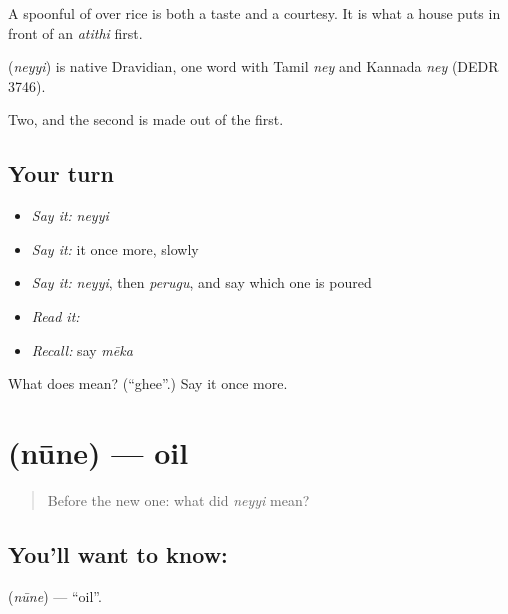 A spoonful of  over rice is both a taste and a courtesy. It is what a house puts in front of an \emph{atithi} first.

\begin{cousinweb}
\textbf{} (\emph{neyyi}) is native Dravidian, one word with Tamil \emph{ney} and Kannada \emph{ney} (DEDR 3746).
\end{cousinweb}

\begin{grammarlens}[title={What you've built}]
Two, and the second is made out of the first.
\end{grammarlens}

\subsection*{Your turn}
\begin{itemize}
\raggedright
  \item \emph{Say it:} \emph{neyyi}
  \item \emph{Say it:} it once more, slowly
  \item \emph{Say it:} \emph{neyyi}, then \emph{perugu}, and say which one is poured
  \item \emph{Read it:} \textbf{}
  \item \emph{Recall:} say \emph{mēka}
\end{itemize}

\begin{tcolorbox}[breakable,colback=teal!4,colframe=teal!35!black,title={Before you move on}]
What does  mean? (\textquotedblleft{}ghee\textquotedblright{}.) Say it once more.
\end{tcolorbox}
\section[\texorpdfstring{\te{నూనె} (nūne)}{నూనె (nūne)}]{ (nūne) — oil}

\label{lesson:TE-C61-oil}



\begin{quote}
Before the new one: what did \emph{neyyi} mean?
\end{quote}

\subsection*{You'll want to know: }
\textbf{} (\emph{nūne}) — \textquotedblleft{}oil\textquotedblright{}.

